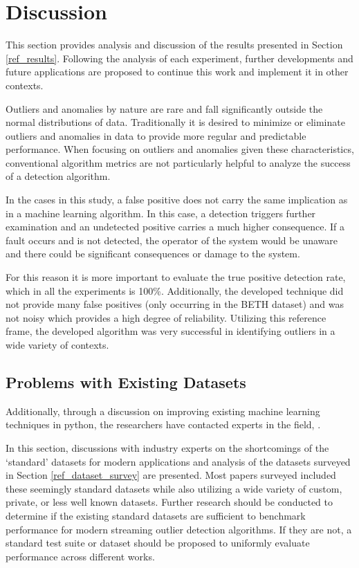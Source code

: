 \section{Discussion}
\label{sec:discussion}
This section provides analysis and discussion of the results presented in Section \ref{ref_results}. Following the analysis of each experiment, further developments and future applications are proposed to continue this work and implement it in other contexts.

Outliers and anomalies by nature are rare and fall significantly outside the normal distributions of data. Traditionally it is desired to minimize or eliminate outliers and anomalies in data to provide more regular and predictable performance. When focusing on outliers and anomalies given these characteristics, conventional algorithm metrics are not particularly helpful to analyze the success of a detection algorithm.

In the cases in this study, a false positive does not carry the same implication as in a machine learning algorithm. In this case, a detection triggers further examination and an undetected positive carries a much higher consequence. If a fault occurs and is not detected, the operator of the system would be unaware and there could be significant consequences or damage to the system.

For this reason it is more important to evaluate the true positive detection rate, which in all the experiments is 100\%. Additionally, the developed technique did not provide many false positives (only occurring in the BETH dataset) and was not noisy which provides a high degree of reliability. Utilizing this reference frame, the developed algorithm was very successful in identifying outliers in a wide variety of contexts.

\subsection{Problems with Existing Datasets}
Additionally, through a discussion on improving existing machine learning techniques in python, the researchers have contacted experts in the field,  .

In this section, discussions with industry experts on the shortcomings of the `standard' datasets for modern applications and analysis of the datasets surveyed in Section \ref{ref_dataset_survey} are presented. Most papers surveyed included these seemingly standard datasets while also utilizing a wide variety of custom, private, or less well known datasets. Further research should be conducted to determine if the existing standard datasets are sufficient to benchmark performance for modern streaming outlier detection algorithms. If they are not, a standard test suite or dataset should be proposed to uniformly evaluate performance across different works.

